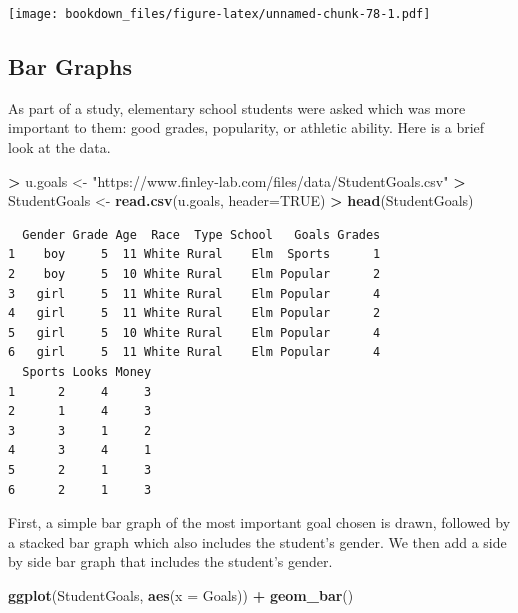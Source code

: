 \documentclass[
]{krantz}
\makeatletter
\newenvironment{Shaded}{\begin{snugshade}}{\end{snugshade}}
\newcommand{\DataTypeTok}[1]{\textcolor[rgb]{0.27,0.27,0.27}{#1}}
\newcommand{\KeywordTok}[1]{\textcolor[rgb]{0.27,0.27,0.27}{\textbf{#1}}}
\newcommand{\NormalTok}[1]{#1}
\newcommand{\OperatorTok}[1]{\textcolor[rgb]{0.43,0.43,0.43}{\textbf{#1}}}
\newcommand{\OtherTok}[1]{\textcolor[rgb]{0.37,0.37,0.37}{#1}}
\newcommand{\StringTok}[1]{\textcolor[rgb]{0.5,0.5,0.5}{#1}}
\newenvironment{kframe}{%
\medskip{}
\setlength{\fboxsep}{.8em}
 \def\at@end@of@kframe{}%
 \ifinner\ifhmode%
  \def\at@end@of@kframe{\end{minipage}}%
  \begin{minipage}{\columnwidth}%
 \fi\fi%
 \def\FrameCommand##1{\hskip\@totalleftmargin \hskip-\fboxsep
 \colorbox{shadecolor}{##1}\hskip-\fboxsep
     \hskip-\linewidth \hskip-\@totalleftmargin \hskip\columnwidth}%
 \MakeFramed {\advance\hsize-\width
   \@totalleftmargin\z@ \linewidth\hsize
   \@setminipage}}%
 {\par\unskip\endMakeFramed%
 \at@end@of@kframe}
\renewenvironment{Shaded}{\begin{kframe}}{\end{kframe}}
\makeatother
\begin{document}
\texttt{[image: bookdown\_files/figure-latex/unnamed-chunk-78-1.pdf]}

\hypertarget{bar-graphs}{%
\subsection{Bar Graphs}\label{bar-graphs}}

As part of a study, elementary school students were asked which was more important to them: good grades, popularity, or athletic ability. Here is a brief look at the data.

\begin{Shaded}
\begin{Highlighting}[]
\OperatorTok{\textgreater{}}\StringTok{ }\NormalTok{u.goals \textless{}{-}}\StringTok{ "https://www.finley{-}lab.com/files/data/StudentGoals.csv"}
\OperatorTok{\textgreater{}}\StringTok{ }\NormalTok{StudentGoals \textless{}{-}}\StringTok{ }\KeywordTok{read.csv}\NormalTok{(u.goals, }\DataTypeTok{header=}\OtherTok{TRUE}\NormalTok{)}
\OperatorTok{\textgreater{}}\StringTok{ }\KeywordTok{head}\NormalTok{(StudentGoals)}
\end{Highlighting}
\end{Shaded}

\begin{verbatim}
  Gender Grade Age  Race  Type School   Goals Grades
1    boy     5  11 White Rural    Elm  Sports      1
2    boy     5  10 White Rural    Elm Popular      2
3   girl     5  11 White Rural    Elm Popular      4
4   girl     5  11 White Rural    Elm Popular      2
5   girl     5  10 White Rural    Elm Popular      4
6   girl     5  11 White Rural    Elm Popular      4
  Sports Looks Money
1      2     4     3
2      1     4     3
3      3     1     2
4      3     4     1
5      2     1     3
6      2     1     3
\end{verbatim}

First, a simple bar graph of the most important goal chosen is drawn, followed by a stacked bar graph which also includes the student's gender. We then add a side by side bar graph that includes the student's gender.

\begin{Shaded}
\begin{Highlighting}[]
\KeywordTok{ggplot}\NormalTok{(StudentGoals, }\KeywordTok{aes}\NormalTok{(}\DataTypeTok{x =}\NormalTok{ Goals)) }\OperatorTok{+}\StringTok{ }\KeywordTok{geom\_bar}\NormalTok{()}
\end{Highlighting}
\end{Shaded}
\end{document}
